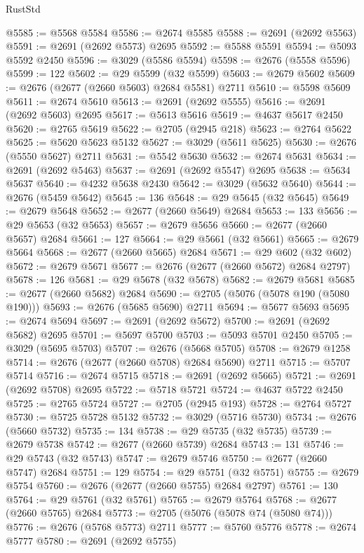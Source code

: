 \begin{lexlean}{RustStd}
\begin{coremodule}
{\begin{coremodule}
{{{{{{{{{{{{{{{{{{{{{{{{{{{{{{{{{{{{{{{{{{{{{{{{{{{{{{{@5585 := @5568 @5584
@5586 := @2674 @5585
@5588 := @2691 (@2692 @5563)
@5591 := @2691 (@2692 @5573) @2695
@5592 := @5588 @5591
@5594 := @5093 @5592 @2450
@5596 := @3029 (@5586 @5594)
@5598 := @2676 (@5558 @5596)
@5599 := 122
@5602 := @29 @5599 (@32 @5599)
@5603 := @2679 @5602
@5609 := @2676 (@2677 (@2660 @5603) @2684 @5581) @2711
@5610 := @5598 @5609
@5611 := @2674 @5610
@5613 := @2691 (@2692 @5555)
@5616 := @2691 (@2692 @5603) @2695
@5617 := @5613 @5616
@5619 := @4637 @5617 @2450
@5620 := @2765 @5619
@5622 := @2705 (@2945 @218)
@5623 := @2764 @5622
@5625 := @5620 @5623 @5132
@5627 := @3029 (@5611 @5625)
@5630 := @2676 (@5550 @5627) @2711
@5631 := @5542 @5630
@5632 := @2674 @5631
@5634 := @2691 (@2692 @5463)
@5637 := @2691 (@2692 @5547) @2695
@5638 := @5634 @5637
@5640 := @4232 @5638 @2430
@5642 := @3029 (@5632 @5640)
@5644 := @2676 (@5459 @5642)
@5645 := 136
@5648 := @29 @5645 (@32 @5645)
@5649 := @2679 @5648
@5652 := @2677 (@2660 @5649) @2684
@5653 := 133
@5656 := @29 @5653 (@32 @5653)
@5657 := @2679 @5656
@5660 := @2677 (@2660 @5657) @2684
@5661 := 127
@5664 := @29 @5661 (@32 @5661)
@5665 := @2679 @5664
@5668 := @2677 (@2660 @5665) @2684
@5671 := @29 @602 (@32 @602)
@5672 := @2679 @5671
@5677 := @2676 (@2677 (@2660 @5672) @2684 @2797)
@5678 := 126
@5681 := @29 @5678 (@32 @5678)
@5682 := @2679 @5681
@5685 := @2677 (@2660 @5682) @2684
@5690 := @2705 (@5076 (@5078 @190 (@5080 @190)))
@5693 := @2676 (@5685 @5690) @2711
@5694 := @5677 @5693
@5695 := @2674 @5694
@5697 := @2691 (@2692 @5672)
@5700 := @2691 (@2692 @5682) @2695
@5701 := @5697 @5700
@5703 := @5093 @5701 @2450
@5705 := @3029 (@5695 @5703)
@5707 := @2676 (@5668 @5705)
@5708 := @2679 @1258
@5714 := @2676 (@2677 (@2660 @5708) @2684 @5690) @2711
@5715 := @5707 @5714
@5716 := @2674 @5715
@5718 := @2691 (@2692 @5665)
@5721 := @2691 (@2692 @5708) @2695
@5722 := @5718 @5721
@5724 := @4637 @5722 @2450
@5725 := @2765 @5724
@5727 := @2705 (@2945 @193)
@5728 := @2764 @5727
@5730 := @5725 @5728 @5132
@5732 := @3029 (@5716 @5730)
@5734 := @2676 (@5660 @5732)
@5735 := 134
@5738 := @29 @5735 (@32 @5735)
@5739 := @2679 @5738
@5742 := @2677 (@2660 @5739) @2684
@5743 := 131
@5746 := @29 @5743 (@32 @5743)
@5747 := @2679 @5746
@5750 := @2677 (@2660 @5747) @2684
@5751 := 129
@5754 := @29 @5751 (@32 @5751)
@5755 := @2679 @5754
@5760 := @2676 (@2677 (@2660 @5755) @2684 @2797)
@5761 := 130
@5764 := @29 @5761 (@32 @5761)
@5765 := @2679 @5764
@5768 := @2677 (@2660 @5765) @2684
@5773 := @2705 (@5076 (@5078 @74 (@5080 @74)))
@5776 := @2676 (@5768 @5773) @2711
@5777 := @5760 @5776
@5778 := @2674 @5777
@5780 := @2691 (@2692 @5755)
}}}}}}}}}}}}}}}}}}}}}}}}}}}}}}}}}}}}}}}}}}}}}}}}}}}}}}}
\end{coremodule}}
\end{coremodule}
\end{lexlean}
